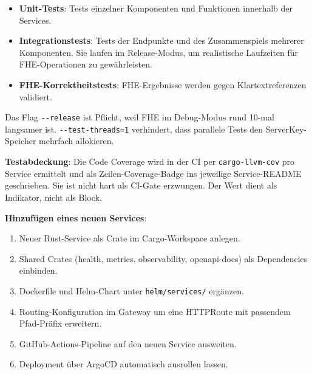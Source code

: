 \begin{itemize}
    \item \textbf{Unit-Tests}: Tests einzelner Komponenten und Funktionen innerhalb der Services.
    \item \textbf{Integrationstests}: Tests der Endpunkte und des Zusammenspiels mehrerer Komponenten. Sie laufen im Release-Modus, um realistische Laufzeiten für FHE-Operationen zu gewährleisten.
    \item \textbf{FHE-Korrektheitstests}: FHE-Ergebnisse werden gegen Klartextreferenzen validiert.
\end{itemize}

Das Flag \verb|--release| ist Pflicht, weil FHE im Debug-Modus rund 10-mal langsamer ist. \verb|--test-threads=1| verhindert, dass parallele Tests den ServerKey-Speicher mehrfach allokieren.

\textbf{Testabdeckung}:
Die Code Coverage wird in der CI per \verb|cargo-llvm-cov| pro Service ermittelt und als Zeilen-Coverage-Badge ins jeweilige Service-README geschrieben. Sie ist nicht hart als CI-Gate erzwungen. Der Wert dient als Indikator, nicht als Block.

\textbf{Hinzufügen eines neuen Services}:
\begin{enumerate}
    \item Neuer Rust-Service als Crate im Cargo-Workspace anlegen.
    \item Shared Crates (health, metrics, observability, openapi-docs) als Dependencies einbinden.
    \item Dockerfile und Helm-Chart unter \verb|helm/services/| ergänzen.
    \item Routing-Konfiguration im Gateway um eine HTTPRoute mit passendem Pfad-Präfix erweitern.
    \item GitHub-Actions-Pipeline auf den neuen Service ausweiten.
    \item Deployment über ArgoCD automatisch ausrollen lassen.
\end{enumerate}